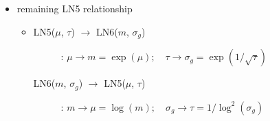 {\begin{itemize}
\begin{itemize}
\begin{description}
\item[LN5($\mu$, $\tau$) $\rightarrow$ LN4($m$, $cv$)]:
$\mu \rightarrow m = \exp(\mu); \quad \tau \rightarrow cv=\sqrt{\exp(1/\tau)-1}$
\end{description}

\item 
\begin{description}
\item[LN4($m$, $cv$) $\rightarrow$ LN6($m$, $\sigma_g$)]:
$m \rightarrow m; \quad cv \rightarrow \sigma_g=\exp\!\big(\sqrt{\log(cv^2+1)}\big) $%

\item[LN6($m$, $\sigma_g$) $\rightarrow$ LN4($m$, $cv$)]:
$m \rightarrow m; \quad \sigma_g \rightarrow cv=\sqrt{\exp\!\big(\log^2(\sigma_g)\big) -1}$ %
\end{description}
\end{itemize}

\item 
remaining LN5 relationship
\begin{itemize}\item 
\begin{description}
\item[LN5($\mu$, $\tau$) $\rightarrow$ LN6($m$, $\sigma_g$)]:
$\mu \rightarrow m=\exp(\mu); \quad \tau \rightarrow \sigma_g= \exp(1/\sqrt{\tau})$

\item[LN6($m$, $\sigma_g$) $\rightarrow$ LN5($\mu$, $\tau$)]:
$m \rightarrow \mu=\log(m); \quad \sigma_g \rightarrow \tau= 1/\log^2 (\sigma_g)$
\end{description}
\end{itemize}

\end{itemize}

}
